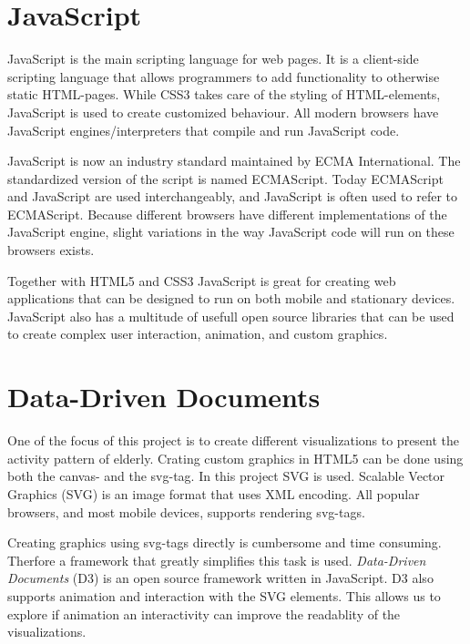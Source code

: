 \section{JavaScript}
JavaScript is the main scripting language for web pages. It is a client-side scripting language that allows programmers to add functionality to otherwise static HTML-pages. While CSS3 takes care of the styling of HTML-elements, JavaScript is used to create customized behaviour. All modern browsers have JavaScript engines/interpreters that compile and run JavaScript code.

JavaScript is now an industry standard maintained by ECMA International. The standardized version of the script is named ECMAScript. Today ECMAScript and JavaScript are used interchangeably, and JavaScript is often used to refer to ECMAScript. Because different browsers have different implementations of the JavaScript engine, slight variations in the way JavaScript code will run on these browsers exists.

Together with HTML5 and CSS3 JavaScript is great for creating web applications that can be designed to run on both mobile and stationary devices. JavaScript also has a multitude of usefull open source libraries that can be used to create complex user interaction, animation, and custom graphics.

\section{Data-Driven Documents}
One of the focus of this project is to create different visualizations to present the activity pattern of elderly. Crating custom graphics in HTML5 can be done using both the canvas- and the svg-tag. In this project SVG is used. Scalable Vector Graphics (SVG) is an image format that uses XML encoding. All popular browsers, and most mobile devices, supports rendering svg-tags.

Creating graphics using svg-tags directly is cumbersome and time consuming. Therfore a framework that greatly simplifies this task is used. \emph{Data-Driven Documents} (D3) is an open source framework written in JavaScript. D3 also supports animation and interaction with the SVG elements. This allows us to explore if animation an interactivity can improve the readablity of the visualizations. 

